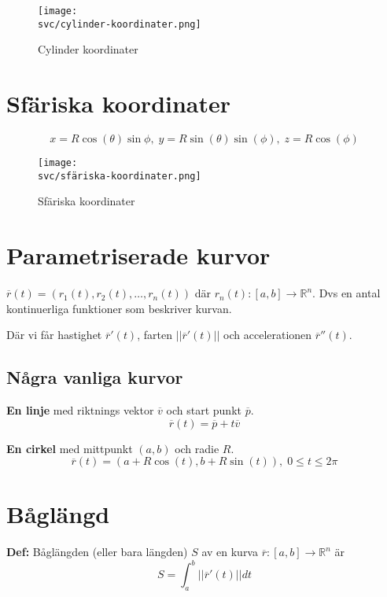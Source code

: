 \begin{figure}[H]
    \centering
    \texttt{[image: \\svc/cylinder-koordinater.png]}
    \caption{Cylinder koordinater}
\end{figure}


\section{Sfäriska koordinater}
\begin{equation*}
    x=R\cos(\theta)\sin{\phi}, \; y=R\sin(\theta)\sin(\phi), \; z=R\cos(\phi)
\end{equation*}

\begin{figure}[H]
    \centering
    \texttt{[image: \\svc/sfäriska-koordinater.png]}
    \caption{Sfäriska koordinater}
\end{figure}



\section{Parametriserade kurvor}
$\overline{r}(t) = (r_1(t), r_2(t), \ldots, r_n(t))$ där $r_n(t):[a,b] \to \mathbb{R}^n$.
Dvs en antal kontinuerliga funktioner som beskriver kurvan.

Där vi får hastighet $\overline{r}'(t)$, farten $||\overline{r}'(t)||$ och accelerationen $\overline{r}''(t)$.

\subsection{Några vanliga kurvor}
\textbf{En linje} med riktnings vektor $\overline{v}$ och start punkt $\overline{p}$.
\begin{equation*}
    \overline{r}(t) = \overline{p} + t\overline{v}
\end{equation*}


\textbf{En cirkel} med mittpunkt $(a,b)$ och radie $R$.
\begin{equation*}
    \overline{r}(t) = (a+R\cos(t), b+R\sin(t)), \; 0\leq t\leq 2\pi 
\end{equation*}

\section{Båglängd}
\textbf{Def:}
Båglängden (eller bara längden) $S$ av en kurva 
$\overline{r}:[a,b]\to\mathbb{R}^n$ är 
\begin{equation*}
    S = \int^{b}_{a} ||\overline{r}'(t)|| dt
\end{equation*}

